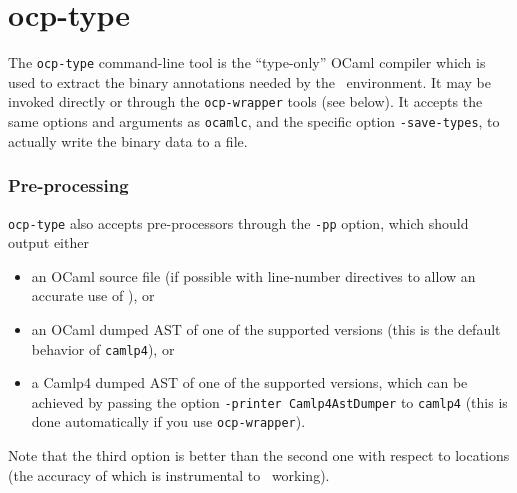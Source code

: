 
\section{ocp-type}

The \verb!ocp-type! command-line tool is the ``type-only'' OCaml compiler
which is used to extract the binary annotations needed by the
\typerex\ environment. It may be invoked directly or through the
\verb!ocp-wrapper! tools (see below). It accepts the same options and
arguments as \verb!ocamlc!, and the specific option
\verb!-save-types!, to actually write the binary data to a file.

\subsubsection*{Pre-processing}
\verb!ocp-type! also accepts pre-processors through the \verb!-pp!
option, which should output either
\begin{itemize}
\item an OCaml source file (if possible with line-number directives to
  allow an accurate use of \typerex), or
\item an OCaml dumped AST of one of the supported versions (this is the
  default behavior of \verb!camlp4!), or
\item a Camlp4 dumped AST of one of the supported versions, which can
  be achieved by passing the option \verb!-printer Camlp4AstDumper! to
  \verb!camlp4! (this is done automatically if you use
  \verb!ocp-wrapper!).
\end{itemize}
Note that the third option is better than the second one with respect
to locations (the accuracy of which is instrumental to \typerex\
working).
